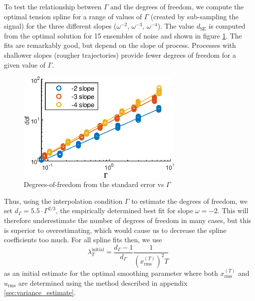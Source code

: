 \documentclass[10pt,journal]{IEEEtran}
\begin{document}
To test the relationship between $\Gamma$ and the degrees of freedom, we compute the optimal tension spline for a range of values of $\Gamma$ (created by sub-sampling the signal) for the three different slopes ($\omega^{-2}$, $\omega^{-3}$, $\omega^{-4}$). The value $d_\textrm{SE}$ is computed from the optimal solution for 15 ensembles of noise and shown in figure \ref{dofVsGamma}. The fits are remarkably good, but depend on the slope of process. Processes with shallower slopes (rougher trajectories) provide fewer degrees of freedom for a given value of $\Gamma$.

\begin{figure}
  \centerline{\includegraphics[width=19pc,angle=0]{figures/dofVsGamma}}
  
  \caption{Degrees-of-freedom from the standard error vs $\Gamma$}
  \label{dofVsGamma}
\end{figure}

Thus, using the interpolation condition $\Gamma$ to estimate the degrees of freedom, we set $d_\Gamma = 5.5 \cdot \Gamma^{2/3}$, the empirically determined best fit for slope $\omega=-2$. This will therefore underestimate the number of degrees of freedom in many cases, but this is superior to overestimating, which would cause us to decrease the spline coefficients too much. For all spline fits then, we use
\begin{equation}
\label{lambda_initial_guess}
\lambda^{\textrm{initial}}_T = \frac{d_\Gamma-1}{d_\Gamma} \frac{1}{ \left(x^{(T)}_{\textrm{rms}}\right)^2  T}
\end{equation}
as an initial estimate for the optimal smoothing parameter where both $x^{(T)}_{\textrm{rms}}$ and $u_\textrm{rms}$ are determined using the method described in appendix \ref{sec:variance_estimate}.
\end{document}
